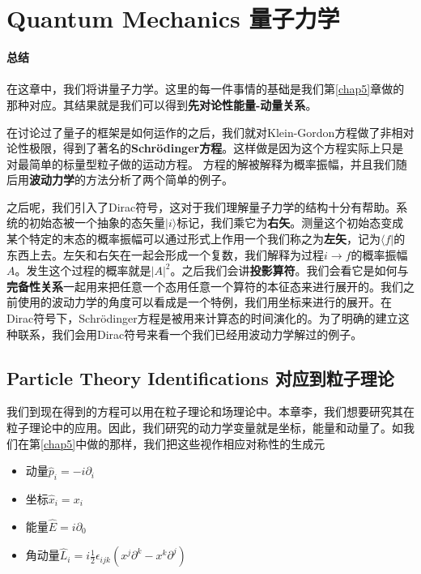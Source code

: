 


\chapter[量子力学]{Quantum Mechanics 量子力学}\label{chap8}

{\Huge\bf 总结\\ \ \\}
在这章中，我们将讲量子力学。这里的每一件事情的基础是我们第\ref{chap5}章做的那种对应。其结果就是我们可以得到{\bf 先对论性能量-动量关系}。

在讨论过了量子的框架是如何运作的之后，我们就对Klein-Gordon方程做了非相对论性极限，得到了著名的{\bf Schrödinger方程}。这样做是因为这个方程实际上只是对最简单的标量型粒子做的运动方程。
方程的解被解释为概率振幅，并且我们随后用{\bf 波动力学}的方法分析了两个简单的例子。

之后呢，我们引入了{Dirac符号}，这对于我们理解量子力学的结构十分有帮助。系统的初始态被一个抽象的态矢量$|i\rangle$标记，我们乘它为{\bf 右矢}。测量这个初始态变成某个特定的末态的概率振幅可以通过形式上作用一个我们称之为{\bf 左矢}，记为$\langle f|$的东西上去。左矢和右矢在一起会形成一个复数，我们解释为过程$i\to f$的概率振幅$A$。发生这个过程的概率就是$|A|^2$。之后我们会讲{\bf 投影算符}。我们会看它是如何与{\bf 完备性关系}一起用来把任意一个态用任意一个算符的本征态来进行展开的。我们之前使用的波动力学的角度可以看成是一个特例，我们用坐标来进行的展开。在Dirac符号下，Schrödinger方程是被用来计算态的时间演化的。为了明确的建立这种联系，我们会用Dirac符号来看一个我们已经用波动力学解过的例子。

\section[对应到粒子理论]{Particle Theory Identifications 对应到粒子理论}\label{sec8.1}
我们到现在得到的方程可以用在粒子理论和场理论中。本章李，我们想要研究其在粒子理论中的应用。因此，我们研究的动力学变量就是坐标，能量和动量了。如我们在第\ref{chap5}中做的那样，我们把这些视作相应对称性的生成元
\begin{itemize}
\item 动量$\hat{p}_i=-i\partial_i$\\
\item 坐标$\hat{x}_i=x_i$\\
\item 能量$\hat{E}=i\partial_0$\\
\item 角动量$\hat{L}_i=i\frac{1}{2}\epsilon_{ijk}(x^j\partial^k-x^k\partial^j)$
\end{itemize}

